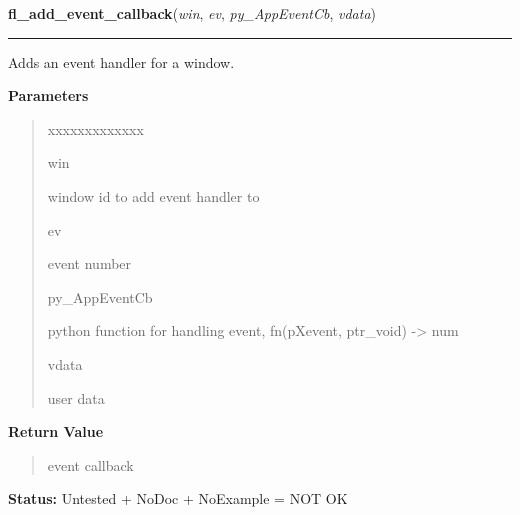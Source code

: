 \hspace{.8\funcindent}\begin{boxedminipage}{\funcwidth}

    \raggedright \textbf{fl\_add\_event\_callback}(\textit{win}, \textit{ev}, \textit{py\_AppEventCb}, \textit{vdata})

    \vspace{-1.5ex}

    \rule{\textwidth}{0.5\fboxrule}
\setlength{\parskip}{2ex}
    Adds an event handler for a window.

\setlength{\parskip}{1ex}
      \textbf{Parameters}
      \vspace{-1ex}

      \begin{quote}
        \begin{Ventry}{xxxxxxxxxxxxx}

          \item[win]

          window id to add event handler to

          \item[ev]

          event number

          \item[py\_AppEventCb]

          python function for handling event, fn(pXevent, ptr\_void) 
          -{\textgreater} num

          \item[vdata]

          user data

        \end{Ventry}

      \end{quote}

      \textbf{Return Value}
    \vspace{-1ex}

      \begin{quote}
      event callback

      \end{quote}

\textbf{Status:} Untested + NoDoc + NoExample = NOT OK



    \end{boxedminipage}

    \label{xformslib:library:fl_remove_event_callback}

